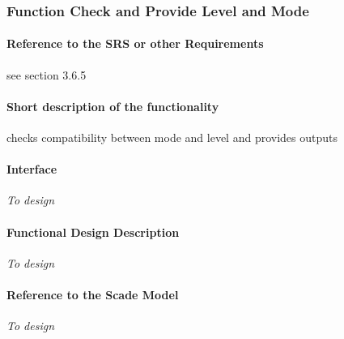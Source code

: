 

\subsubsection{Function Check and Provide Level and Mode}%
\paragraph{Reference to the SRS or other Requirements}
see \citep{subset-026} section 3.6.5

\paragraph{Short description of the functionality}
checks compatibility between mode and level and provides outputs

\paragraph{Interface}
\emph{To design}

\paragraph{Functional Design Description}
\emph{To design}

\paragraph{Reference to the Scade Model}
\emph{To design}
